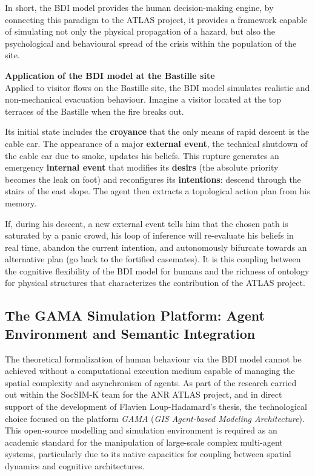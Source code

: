 \documentclass{article}
\begin{document}
In short, the BDI model provides the human decision-making engine, by connecting this paradigm to the ATLAS project, it provides a framework capable of simulating not only the physical propagation of a hazard, but also the psychological and behavioural spread of the crisis within the population of the site.
\begin{filrouge}
\textbf{Application of the BDI model at the Bastille site} \\
Applied to visitor flows on the Bastille site, the BDI model simulates realistic and non-mechanical evacuation behaviour. Imagine a visitor located at the top terraces of the Bastille when the fire breaks out.

Its initial state includes the \textbf{croyance} that the only means of rapid descent is the cable car. The appearance of a major \textbf{external event}, the technical shutdown of the cable car due to smoke, updates his beliefs. This rupture generates an emergency \textbf{internal event} that modifies its \textbf{desirs} (the absolute priority becomes the leak on foot) and reconfigures its \textbf{intentions}: descend through the stairs of the east slope. The agent then extracts a topological action plan from his memory.

If, during his descent, a new external event tells him that the chosen path is saturated by a panic crowd, his loop of inference will re-evaluate his beliefs in real time, abandon the current intention, and autonomously bifurcate towards an alternative plan (go back to the fortified casemates). It is this coupling between the cognitive flexibility of the BDI model for humans and the richness of ontology for physical structures that characterizes the contribution of the ATLAS project.
\end{filrouge}

\subsection{The GAMA Simulation Platform: Agent Environment and Semantic Integration}
\label{subsec:plateforme_gama}

The theoretical formalization of human behaviour via the BDI model cannot be achieved without a computational execution medium capable of managing the spatial complexity and asynchronism of agents. As part of the research carried out within the SocSIM-K team for the ANR ATLAS project, and in direct support of the development of Flavien Loup-Hadamard's thesis, the technological choice focused on the platform \textit{GAMA} (\textit{GIS Agent-based Modeling Architecture}). This open-source modelling and simulation environment is required as an academic standard for the manipulation of large-scale complex multi-agent systems, particularly due to its native capacities for coupling between spatial dynamics and cognitive architectures.
\end{document}
